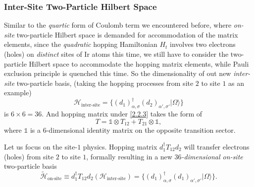 \documentclass[10pt,nofootinbib]{revtex4}
\begin{document}
		\subsubsection{Inter-Site Two-Particle Hilbert Space}
			Similar to the \emph{quartic} form of Coulomb term we encountered before, where \emph{on-site} two-particle Hilbert space is demanded for accommodation of the matrix elements, since the \emph{quadratic} hopping Hamiltonian $H_t$ involves two electrons (holes) on \emph{distinct} sites of Ir atoms this time, we still have to consider the two-particle Hilbert space to accommodate the hopping matrix elements, while Pauli exclusion principle is quenched this time. So the dimensionality of out new \emph{inter-site} two-particle basis, (taking the hopping processes from site $2$ to site $1$ as an example)
			\begin{equation}\label{2.2.3}
				\mathcal{H}_{\text{inter-site}}=\{(d_1)_{\alpha,\sigma}^\dagger(d_2)_{\alpha',\sigma'}|\Omega\rangle\}
			\end{equation}
			is $6\times 6=36$. And hopping matrix under \eqref{2.2.3} takes the form of
			\begin{equation}\label{2.2.4}
				T=\mathds{1}\otimes T_{12}+T_{21}\otimes\mathds{1},
			\end{equation}
			where $\mathds{1}$ is a $6$-dimensional identity matrix on the opposite transition sector.\par
			Let us focus on the site-$1$ physics. Hopping matrix $d_1^\dagger T_{12}d_2$ will transfer electrons (holes) from site $2$ to site $1$, formally resulting in a new \emph{$36$-dimensional on-site} two-particle basis
			\begin{equation*}
				\widetilde{\mathcal{H}}_{\text{on-site}} \equiv d_1^\dagger T_{12}d_2(\mathcal{H}_{\text{inter-site}})=\{(d_1)_{\alpha,\sigma}^\dagger(d_1)_{\alpha',\sigma'}|\Omega\rangle\}.
			\end{equation*}
\end{document}
